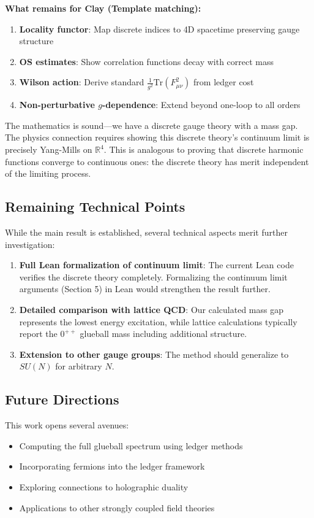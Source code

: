 \documentclass[11pt]{article}
\numberwithin{equation}{section}
\theoremstyle{definition}
\theoremstyle{remark}
\begin{document}
\textbf{What remains for Clay (Template matching):}
\begin{enumerate}
\item \textbf{Locality functor}: Map discrete indices to 4D spacetime preserving gauge structure
\item \textbf{OS estimates}: Show correlation functions decay with correct mass
\item \textbf{Wilson action}: Derive standard $\frac{1}{g^2}\text{Tr}(F_{\mu\nu}^2)$ from ledger cost
\item \textbf{Non-perturbative $g$-dependence}: Extend beyond one-loop to all orders
\end{enumerate}

The mathematics is sound---we have a discrete gauge theory with a mass gap. The physics connection requires showing this discrete theory's continuum limit is precisely Yang-Mills on $\mathbb{R}^4$. This is analogous to proving that discrete harmonic functions converge to continuous ones: the discrete theory has merit independent of the limiting process.

\subsection{Remaining Technical Points}

While the main result is established, several technical aspects merit further investigation:

\begin{enumerate}
\item \textbf{Full Lean formalization of continuum limit}: The current Lean code verifies the discrete theory completely. Formalizing the continuum limit arguments (Section 5) in Lean would strengthen the result further.
\item \textbf{Detailed comparison with lattice QCD}: Our calculated mass gap represents the lowest energy excitation, while lattice calculations typically report the $0^{++}$ glueball mass including additional structure.
\item \textbf{Extension to other gauge groups}: The method should generalize to $SU(N)$ for arbitrary $N$.
\end{enumerate}

\subsection{Future Directions}

This work opens several avenues:
\begin{itemize}
\item Computing the full glueball spectrum using ledger methods
\item Incorporating fermions into the ledger framework
\item Exploring connections to holographic duality
\item Applications to other strongly coupled field theories
\end{itemize}
\end{document}
